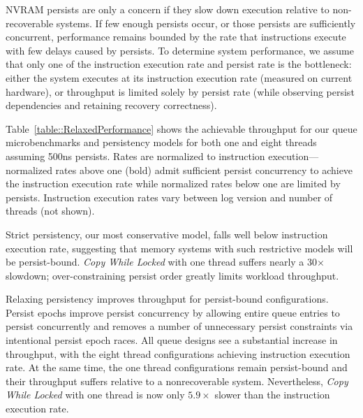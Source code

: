 NVRAM persists are only a concern if they slow down execution relative to non-recoverable systems.
If few enough persists occur, or those persists are sufficiently concurrent, performance remains bounded by the rate that instructions execute with few delays caused by persists.
To determine system performance, we assume that only one of the instruction execution rate and persist rate is the bottleneck: either the system executes at its instruction execution rate (measured on current hardware), or throughput is limited solely by persist rate (while observing persist dependencies and retaining recovery correctness).



Table~\ref{table::RelaxedPerformance} shows the achievable throughput for our queue microbenchmarks and persistency models for both one and eight threads assuming 500ns persists.
Rates are normalized to instruction execution---normalized rates above one (bold) admit sufficient persist concurrency to achieve the instruction execution rate while normalized rates below one are limited by persists.
Instruction execution rates vary between log version and number of threads (not shown).

Strict persistency, our most conservative model, falls well below instruction execution rate, suggesting that memory systems with such restrictive models will be persist-bound.
\emph{Copy While Locked} with one thread suffers nearly a 30$\times$ slowdown; over-constraining persist order greatly limits workload throughput.

Relaxing persistency improves throughput for persist-bound configurations.
Persist epochs improve persist concurrency by allowing entire queue entries to persist concurrently and removes a number of unnecessary persist constraints via intentional persist epoch races.
All queue designs see a substantial increase in throughput, with the eight thread configurations achieving instruction execution rate.
At the same time, the one thread configurations remain persist-bound and their throughput suffers relative to a nonrecoverable system.
Nevertheless, \emph{Copy While Locked} with one thread is now only $5.9\times$ slower than the instruction execution rate.

